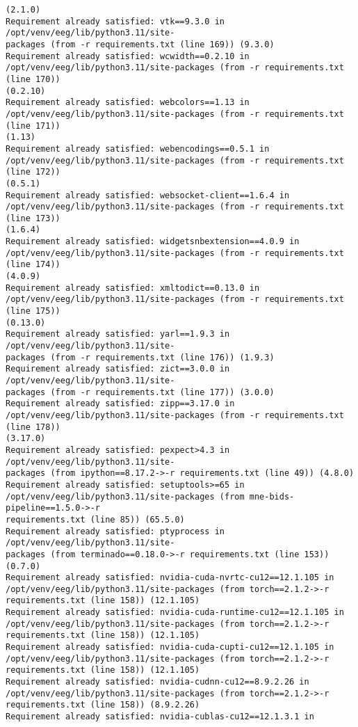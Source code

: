 \documentclass[11pt]{article}
\begin{document}
\begin{Verbatim}[commandchars=\\\{\}]
(2.1.0)
Requirement already satisfied: vtk==9.3.0 in /opt/venv/eeg/lib/python3.11/site-
packages (from -r requirements.txt (line 169)) (9.3.0)
Requirement already satisfied: wcwidth==0.2.10 in
/opt/venv/eeg/lib/python3.11/site-packages (from -r requirements.txt (line 170))
(0.2.10)
Requirement already satisfied: webcolors==1.13 in
/opt/venv/eeg/lib/python3.11/site-packages (from -r requirements.txt (line 171))
(1.13)
Requirement already satisfied: webencodings==0.5.1 in
/opt/venv/eeg/lib/python3.11/site-packages (from -r requirements.txt (line 172))
(0.5.1)
Requirement already satisfied: websocket-client==1.6.4 in
/opt/venv/eeg/lib/python3.11/site-packages (from -r requirements.txt (line 173))
(1.6.4)
Requirement already satisfied: widgetsnbextension==4.0.9 in
/opt/venv/eeg/lib/python3.11/site-packages (from -r requirements.txt (line 174))
(4.0.9)
Requirement already satisfied: xmltodict==0.13.0 in
/opt/venv/eeg/lib/python3.11/site-packages (from -r requirements.txt (line 175))
(0.13.0)
Requirement already satisfied: yarl==1.9.3 in /opt/venv/eeg/lib/python3.11/site-
packages (from -r requirements.txt (line 176)) (1.9.3)
Requirement already satisfied: zict==3.0.0 in /opt/venv/eeg/lib/python3.11/site-
packages (from -r requirements.txt (line 177)) (3.0.0)
Requirement already satisfied: zipp==3.17.0 in
/opt/venv/eeg/lib/python3.11/site-packages (from -r requirements.txt (line 178))
(3.17.0)
Requirement already satisfied: pexpect>4.3 in /opt/venv/eeg/lib/python3.11/site-
packages (from ipython==8.17.2->-r requirements.txt (line 49)) (4.8.0)
Requirement already satisfied: setuptools>=65 in
/opt/venv/eeg/lib/python3.11/site-packages (from mne-bids-pipeline==1.5.0->-r
requirements.txt (line 85)) (65.5.0)
Requirement already satisfied: ptyprocess in /opt/venv/eeg/lib/python3.11/site-
packages (from terminado==0.18.0->-r requirements.txt (line 153)) (0.7.0)
Requirement already satisfied: nvidia-cuda-nvrtc-cu12==12.1.105 in
/opt/venv/eeg/lib/python3.11/site-packages (from torch==2.1.2->-r
requirements.txt (line 158)) (12.1.105)
Requirement already satisfied: nvidia-cuda-runtime-cu12==12.1.105 in
/opt/venv/eeg/lib/python3.11/site-packages (from torch==2.1.2->-r
requirements.txt (line 158)) (12.1.105)
Requirement already satisfied: nvidia-cuda-cupti-cu12==12.1.105 in
/opt/venv/eeg/lib/python3.11/site-packages (from torch==2.1.2->-r
requirements.txt (line 158)) (12.1.105)
Requirement already satisfied: nvidia-cudnn-cu12==8.9.2.26 in
/opt/venv/eeg/lib/python3.11/site-packages (from torch==2.1.2->-r
requirements.txt (line 158)) (8.9.2.26)
Requirement already satisfied: nvidia-cublas-cu12==12.1.3.1 in

\end{Verbatim}
\end{document}
